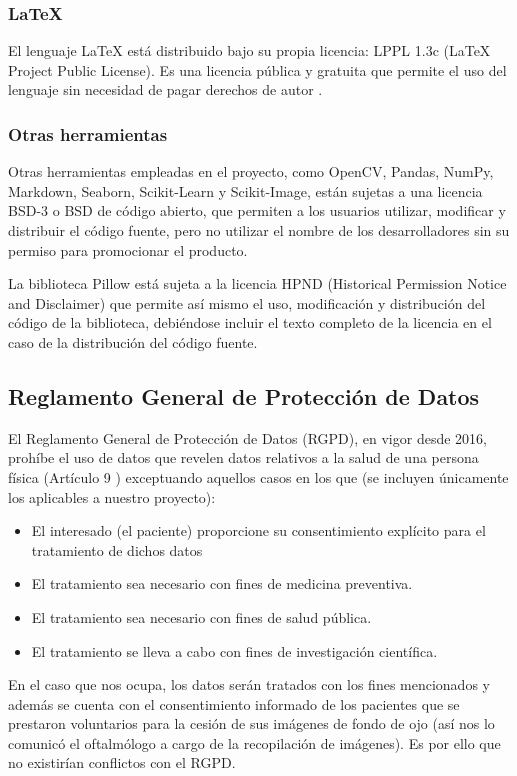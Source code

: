 \subsubsection{\LaTeX}

El lenguaje LaTeX está distribuido bajo su propia licencia: LPPL 1.3c (LaTeX Project Public License). Es una licencia pública y gratuita que permite el uso del lenguaje sin necesidad de pagar derechos de autor \cite{licenc:latex}.

\subsubsection{Otras herramientas}

Otras herramientas empleadas en el proyecto, como OpenCV, Pandas, NumPy, Markdown, Seaborn, Scikit-Learn y Scikit-Image, están sujetas a una licencia BSD-3 o BSD de código abierto, que permiten a los usuarios utilizar, modificar y distribuir el código fuente, pero no utilizar el nombre de los desarrolladores sin su permiso para promocionar el producto.

La biblioteca Pillow está sujeta a la licencia HPND (Historical Permission Notice and Disclaimer) que permite así mismo el uso, modificación y distribución del código de la biblioteca, debiéndose incluir el texto completo de la licencia en el caso de la distribución del código fuente.

\subsection{Reglamento General de Protección de Datos}

El Reglamento General de Protección de Datos (RGPD), en vigor desde 2016, prohíbe el uso de datos que revelen datos relativos a la salud de una persona física (Artículo 9 \cite{RGPD:BOE}) exceptuando aquellos casos en los que (se incluyen únicamente los aplicables a nuestro proyecto):
\begin{itemize}
    \item El interesado (el paciente) proporcione su consentimiento explícito para el tratamiento de dichos datos
    \item El tratamiento sea necesario con fines de medicina preventiva.
    \item El tratamiento sea necesario con fines de salud pública.
    \item El tratamiento se lleva a cabo con fines de investigación científica.
\end{itemize}

En el caso que nos ocupa, los datos serán tratados con los fines mencionados y además se cuenta con el consentimiento informado de los pacientes que se prestaron voluntarios para la cesión de sus imágenes de fondo de ojo (así nos lo comunicó el oftalmólogo a cargo de la recopilación de imágenes). Es por ello que no existirían conflictos con el RGPD.